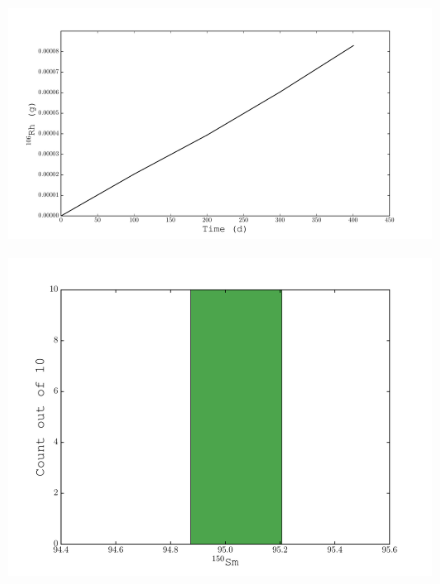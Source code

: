 \documentclass{beamer}
\begin{document}
\begin{frame}
    \begin{figure}[H]
    \begin{center}
      \includegraphics[width=0.77\columnwidth]{../Origen2/PLOTS/RH106Post_XY.pdf}
      \vspace{-5mm}
      \label{fig:POSTXYRh106}
    \end{center}
  \end{figure}
\end{frame}
    
\begin{frame}
  \begin{figure}[H]
    \begin{center}
      \includegraphics[width=0.77\columnwidth]{../Origen2/PLOTS/SM150Post_HIST.pdf}
      \vspace{-5mm}
      \label{fig:POSTHISTSm150}
    \end{center}
  \end{figure}
\end{frame}
  
\end{document}
